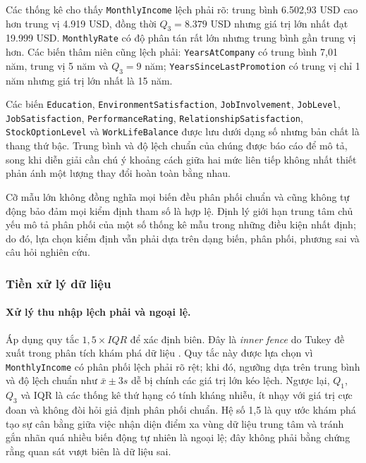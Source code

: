 Các thống kê cho thấy \texttt{MonthlyIncome} lệch phải rõ: trung bình
6.502,93 USD cao hơn trung vị 4.919 USD, đồng thời \(Q_3=8.379\) USD
nhưng giá trị lớn nhất đạt 19.999 USD. \texttt{MonthlyRate} có độ phân
tán rất lớn nhưng trung bình gần trung vị hơn. Các biến thâm niên cũng
lệch phải: \texttt{YearsAtCompany} có trung bình 7,01 năm, trung vị 5
năm và \(Q_3=9\) năm; \texttt{YearsSinceLastPromotion} có trung vị chỉ
1 năm nhưng giá trị lớn nhất là 15 năm.

Các biến \texttt{Education}, \texttt{EnvironmentSatisfaction},
\texttt{JobInvolvement}, \texttt{JobLevel}, \texttt{JobSatisfaction},
\texttt{PerformanceRating}, \texttt{RelationshipSatisfaction},
\texttt{StockOptionLevel} và \texttt{WorkLifeBalance} được lưu dưới
dạng số nhưng bản chất là thang thứ bậc. Trung bình và độ lệch chuẩn của
chúng được báo cáo để mô tả, song khi diễn giải cần chú ý khoảng cách
giữa hai mức liên tiếp không nhất thiết phản ánh một lượng thay đổi hoàn
toàn bằng nhau.

Cỡ mẫu lớn không đồng nghĩa mọi biến đều phân phối chuẩn và cũng không
tự động bảo đảm mọi kiểm định tham số là hợp lệ. Định lý giới hạn trung
tâm chủ yếu mô tả phân phối của một số thống kê mẫu trong những điều
kiện nhất định; do đó, lựa chọn kiểm định vẫn phải dựa trên dạng biến,
phân phối, phương sai và câu hỏi nghiên cứu.

\subsubsection{Tiền xử lý dữ liệu}

\paragraph{Xử lý thu nhập lệch phải và ngoại lệ.}

Áp dụng quy tắc \(1{,}5\times IQR\) để xác định biên. Đây là
\emph{inner fence} do Tukey đề xuất trong phân tích khám phá dữ liệu
\cite{tukey1977}. Quy tắc này được lựa chọn vì \texttt{MonthlyIncome}
có phân phối lệch phải rõ rệt; khi đó, ngưỡng dựa trên trung bình và độ
lệch chuẩn như \(\bar{x}\pm3s\) dễ bị chính các giá trị lớn kéo lệch.
Ngược lại, \(Q_1\), \(Q_3\) và IQR là các thống kê thứ hạng có tính
kháng nhiễu, ít nhạy với giá trị cực đoan và không đòi hỏi giả định phân
phối chuẩn. Hệ số 1,5 là quy ước khám phá tạo sự cân bằng giữa việc nhận
diện điểm xa vùng dữ liệu trung tâm và tránh gắn nhãn quá nhiều biến
động tự nhiên là ngoại lệ; đây không phải bằng chứng rằng quan sát vượt
biên là dữ liệu sai.

